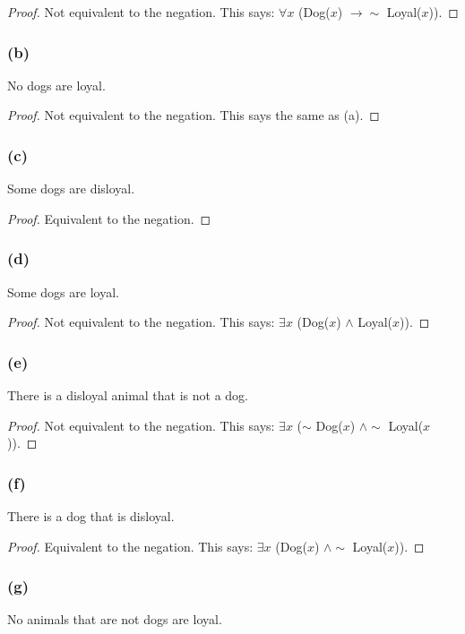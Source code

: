\documentclass[14pt]{extarticle}
\newcommand{\fa}{\forall}
\newcommand{\te}{\exists}
\begin{document}
\begin{proof}
    Not equivalent to the negation. This says: $\fa x$ (Dog($x$) $\to\sim$ Loyal($x$)).
\end{proof}

\subsubsection{(b)}
No dogs are loyal.

\begin{proof}
    Not equivalent to the negation. This says the same as (a).
\end{proof}

\subsubsection{(c)}
Some dogs are disloyal.

\begin{proof}
    Equivalent to the negation.
\end{proof}

\subsubsection{(d)}
Some dogs are loyal.

\begin{proof}
    Not equivalent to the negation. This says: $\te x$ (Dog($x$) $\wedge$ Loyal($x$)).
\end{proof}

\subsubsection{(e)}
There is a disloyal animal that is not a dog.

\begin{proof}
    Not equivalent to the negation. This says: $\te x$ ($\sim$ Dog($x$) $\wedge\sim$ Loyal($x$)).
\end{proof}

\subsubsection{(f)}
There is a dog that is disloyal.

\begin{proof}
    Equivalent to the negation. This says: $\te x$ (Dog($x$) $\wedge\sim$ Loyal($x$)).
\end{proof}

\subsubsection{(g)}
No animals that are not dogs are loyal.
\end{document}
